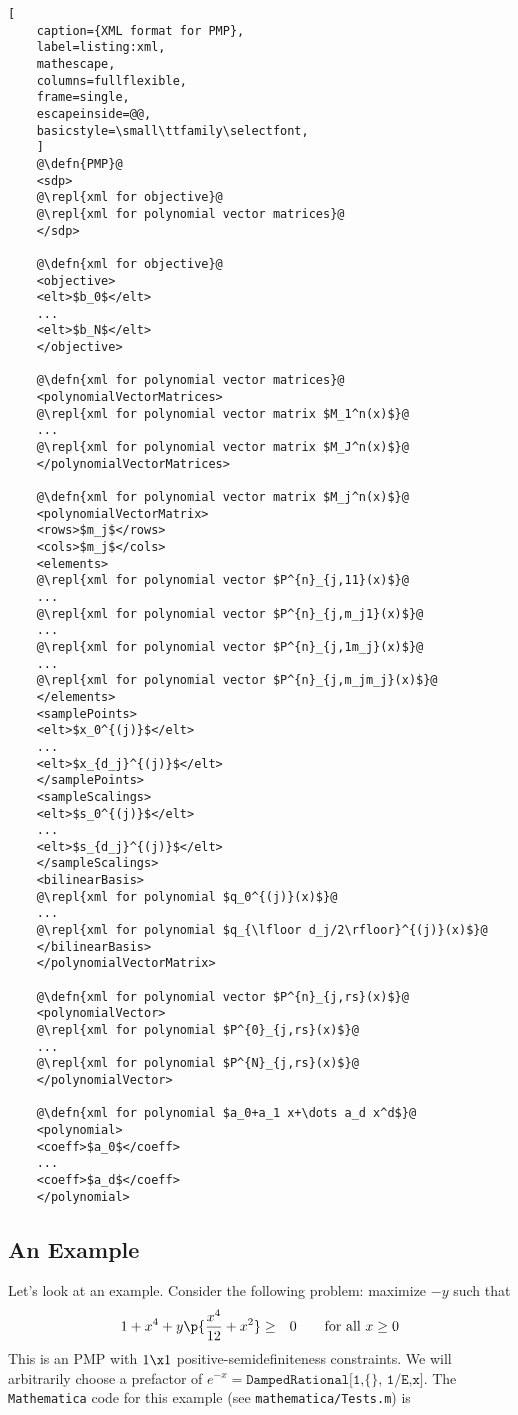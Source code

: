 \documentclass[12pt]{article}
\numberwithin{equation}{section}
\renewcommand{\be}{\begin{eqnarray}}
\renewcommand{\ee}{\end{eqnarray}}
\newcommand\repl[1]{$\langle$\textrm{\em #1}$\rangle$}
\newcommand\defn[1]{\textrm{\em #1}\ $\equiv$}
\begin{document}
\begin{lstlisting}[
	caption={XML format for PMP},
	label=listing:xml,
	mathescape,
	columns=fullflexible,
	frame=single,
	escapeinside=@@,
	basicstyle=\small\ttfamily\selectfont,
	]
	@\defn{PMP}@
	<sdp>
	@\repl{xml for objective}@
	@\repl{xml for polynomial vector matrices}@
	</sdp>
	
	@\defn{xml for objective}@
	<objective>
	<elt>$b_0$</elt>
	...
	<elt>$b_N$</elt>
	</objective>
	
	@\defn{xml for polynomial vector matrices}@
	<polynomialVectorMatrices>
	@\repl{xml for polynomial vector matrix $M_1^n(x)$}@
	...
	@\repl{xml for polynomial vector matrix $M_J^n(x)$}@
	</polynomialVectorMatrices>
	
	@\defn{xml for polynomial vector matrix $M_j^n(x)$}@
	<polynomialVectorMatrix>
	<rows>$m_j$</rows>
	<cols>$m_j$</cols>
	<elements>
	@\repl{xml for polynomial vector $P^{n}_{j,11}(x)$}@
	...
	@\repl{xml for polynomial vector $P^{n}_{j,m_j1}(x)$}@
	...
	@\repl{xml for polynomial vector $P^{n}_{j,1m_j}(x)$}@
	...
	@\repl{xml for polynomial vector $P^{n}_{j,m_jm_j}(x)$}@
	</elements>
	<samplePoints>
	<elt>$x_0^{(j)}$</elt>
	...
	<elt>$x_{d_j}^{(j)}$</elt>
	</samplePoints>
	<sampleScalings>
	<elt>$s_0^{(j)}$</elt>
	...
	<elt>$s_{d_j}^{(j)}$</elt>
	</sampleScalings>
	<bilinearBasis>
	@\repl{xml for polynomial $q_0^{(j)}(x)$}@
	...
	@\repl{xml for polynomial $q_{\lfloor d_j/2\rfloor}^{(j)}(x)$}@
	</bilinearBasis>
	</polynomialVectorMatrix>
	
	@\defn{xml for polynomial vector $P^{n}_{j,rs}(x)$}@
	<polynomialVector>
	@\repl{xml for polynomial $P^{0}_{j,rs}(x)$}@
	...
	@\repl{xml for polynomial $P^{N}_{j,rs}(x)$}@
	</polynomialVector>
	
	@\defn{xml for polynomial $a_0+a_1 x+\dots a_d x^d$}@
	<polynomial>
	<coeff>$a_0$</coeff>
	...
	<coeff>$a_d$</coeff>
	</polynomial>
\end{lstlisting}

\subsection{An Example}
\label{sec:example}

Let's look at an example.  Consider the following problem: maximize $-y$ such that
\be
\label{eq:exampleproblem}
1+x^4 + y\p{\frac{x^4}{12} + x^2} &\geq& 0\qquad \textrm{for all $x\geq 0$}
\ee
This is an PMP with $1\x1$ positive-semidefiniteness constraints.  We will arbitrarily choose a prefactor of $e^{-x}=\texttt{DampedRational[1,\{\}, 1/E,x]}$.
The \texttt{Mathematica} code for this example (see \texttt{mathematica/Tests.m}) is
\end{document}
